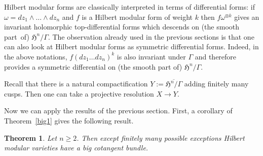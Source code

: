 \documentclass[10pt]{amsart}
\theoremstyle{plain}
\newtheorem{theorem}{Theorem}[section]
\theoremstyle{definition}
\numberwithin{equation}{theorem}
\newcommand\HH{\mathfrak H}
\begin{document}
Hilbert modular forms are classically interpreted in terms of differential forms: if~$\omega=dz_1\wedge \dots \wedge dz_n$ and $f$ is a Hilbert modular form of weight $k$ then $f\omega^{\otimes k}$ gives an invariant holomorphic top-differential forms which descends on (the smooth part~of) $\HH^n/\Gamma$. The observation already used in the previous sections is that one can also look at Hilbert modular forms as symmetric differential forms. Indeed, in the above notations, $f(dz_1\dots dz_n)^k$ is also invariant under $\Gamma$ and therefore provides a symmetric differential on (the smooth part of) $\HH^n/\Gamma$.

Recall that there is a natural compactification $Y:=\overline{\HH^n/\Gamma}$ adding finitely many cusps. Then one can take a projective resolution $X \to Y$.

Now we can apply the results of the previous section. First, a corollary of Theorem~\ref{big1} gives the following result.

\begin{theorem}\label{bigHMV}
Let $n \geq 2$. Then except finitely many possible exceptions Hilbert modular varieties have a big cotangent bundle.
\end{theorem}
\end{document}
